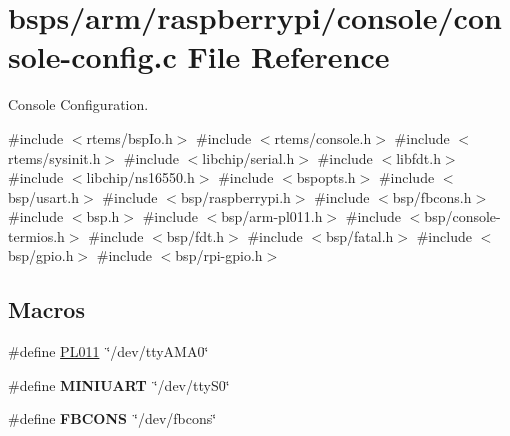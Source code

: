 \hypertarget{arm_2raspberrypi_2console_2console-config_8c}{}\section{bsps/arm/raspberrypi/console/console-\/config.c File Reference}
\label{arm_2raspberrypi_2console_2console-config_8c}


Console Configuration.  


{\ttfamily \#include $<$rtems/bsp\+Io.\+h$>$}\newline
{\ttfamily \#include $<$rtems/console.\+h$>$}\newline
{\ttfamily \#include $<$rtems/sysinit.\+h$>$}\newline
{\ttfamily \#include $<$libchip/serial.\+h$>$}\newline
{\ttfamily \#include $<$libfdt.\+h$>$}\newline
{\ttfamily \#include $<$libchip/ns16550.\+h$>$}\newline
{\ttfamily \#include $<$bspopts.\+h$>$}\newline
{\ttfamily \#include $<$bsp/usart.\+h$>$}\newline
{\ttfamily \#include $<$bsp/raspberrypi.\+h$>$}\newline
{\ttfamily \#include $<$bsp/fbcons.\+h$>$}\newline
{\ttfamily \#include $<$bsp.\+h$>$}\newline
{\ttfamily \#include $<$bsp/arm-\/pl011.\+h$>$}\newline
{\ttfamily \#include $<$bsp/console-\/termios.\+h$>$}\newline
{\ttfamily \#include $<$bsp/fdt.\+h$>$}\newline
{\ttfamily \#include $<$bsp/fatal.\+h$>$}\newline
{\ttfamily \#include $<$bsp/gpio.\+h$>$}\newline
{\ttfamily \#include $<$bsp/rpi-\/gpio.\+h$>$}\newline
\subsection*{Macros}
\begin{DoxyCompactItemize}
\item 
\#define \mbox{\hyperlink{arm_2raspberrypi_2console_2console-config_8c_aba8a344c89ec5486086ceff906bcf129}{P\+L011}}~\char`\"{}/dev/tty\+A\+M\+A0\char`\"{}
\item 
\mbox{\label{arm_2raspberrypi_2console_2console-config_8c_a5e478ca27806b8b33d788e9719e384f9}} 
\#define {\bfseries M\+I\+N\+I\+U\+A\+RT}~\char`\"{}/dev/tty\+S0\char`\"{}
\item 
\mbox{\label{arm_2raspberrypi_2console_2console-config_8c_a46d8eb1f7e4bfff941f9f82231d5601d}} 
\#define {\bfseries F\+B\+C\+O\+NS}~\char`\"{}/dev/fbcons\char`\"{}
\end{DoxyCompactItemize}
